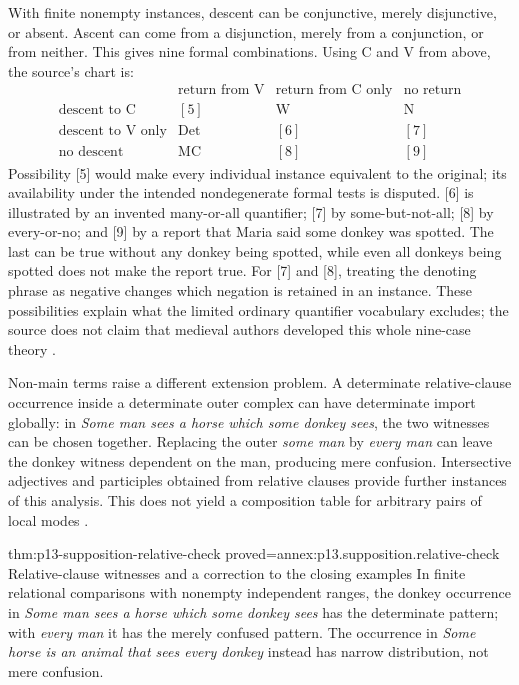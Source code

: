 With finite nonempty instances, descent can be conjunctive, merely
disjunctive, or absent. Ascent can come from a disjunction, merely from
a conjunction, or from neither. This gives nine formal combinations.
Using C and V from above, the source's chart is:
\[
\begin{array}{c|ccc}
 &\text{return from V}&\text{return from C only}&\text{no return}\\\hline
\text{descent to C}&[5]&\mathrm W&\mathrm N\\
\text{descent to V only}&\mathrm{Det}&[6]&[7]\\
\text{no descent}&\mathrm{MC}&[8]&[9]
\end{array}
\]
Possibility [5] would make every individual instance equivalent to the
original; its availability under the intended nondegenerate formal
tests is disputed. [6] is illustrated by an invented many-or-all
quantifier; [7] by some-but-not-all; [8] by every-or-no; and [9] by
a report that Maria said some donkey was spotted. The last can be true
without any donkey being spotted, while even all donkeys being spotted
does not make the report true. For [7] and [8], treating the denoting
phrase as negative changes which negation is retained in an instance.
These possibilities explain what the limited ordinary quantifier
vocabulary excludes; the source does not claim that medieval authors
developed this whole nine-case theory
\cite[pp.~273--274]{Parsons2007FordhamSupposition}.

Non-main terms raise a different extension problem. A determinate
relative-clause occurrence inside a determinate outer complex can have
determinate import globally: in \emph{Some man sees a horse which
some donkey sees}, the two witnesses can be chosen together. Replacing
the outer \emph{some man} by \emph{every man} can leave the donkey
witness dependent on the man, producing mere confusion. Intersective
adjectives and participles obtained from relative clauses provide further
instances of this analysis. This does not yield a composition table
for arbitrary pairs of local modes
\cite[pp.~274--276]{Parsons2007FordhamSupposition}.

\begin{hbtheorem}{thm:p13-supposition-relative-check}
 {proved=annex:p13.supposition.relative-check}
 {Relative-clause witnesses and a correction to the closing examples}
In finite relational comparisons with nonempty independent ranges,
the donkey occurrence in \emph{Some man sees a horse which some
donkey sees} has the determinate pattern; with \emph{every man}
it has the merely confused pattern. The occurrence in \emph{Some
horse is an animal that sees every donkey} instead has narrow
distribution, not mere confusion.
\end{hbtheorem}

